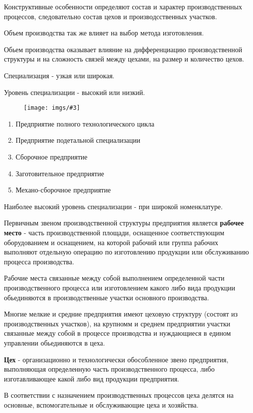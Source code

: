 \documentclass[14pt,a4paper,oneside]{extarticle}
\newcommand{\pic}[3]{
	\begin{figure}[#1]
		\begin{center}
			\texttt{[image: imgs/\#3]}
		\end{center}
	\end{figure}
}
\begin{document}
Конструктивные особенности определяют состав и характер производственных процессов, следовательно состав цехов и производсственных участков.

Объем производства так же влияет на выбор метода изготовления.

Обьем производства оказывает влияние на дифференциацию производственной структуры и на сложность связей между цехами, на размер и количество цехов.

Специализация - узкая или широкая.

Уровень специализации - высокий или низкий.

\pic{H}{\textwidth/2}{9}

\begin{enumerate}
    \item Предприятие полного технологического цикла 
    \item Предприятие подетальной специализации
    \item Сборочное предприятие
    \item Заготовительное предприятие 
    \item Механо-сборочное предприятие
\end{enumerate}

Наиболее высокий уровень специализации - при широкой номенклатуре.

Первичным звеном производственной структуры предприятия является \textbf{рабочее место} - часть производственной площади, оснащенное соответствующим оборудованием и оснащением, на которой рабочий или группа рабочих выполняют отдельную операцию по изготовлению продукции или обслуживанию процесса производства.

Рабочие места связанные между собой выполнением определенной части производственного процесса или изготовлением какого либо вида продукции обьединяются в производственные участки основного производства.

Многие мелкие и средние предприятия имеют цеховую структуру (состоят из производственных участков), на крупномм и среднем предприятии участки связанные между собой в процессе производства и нуждающиеся в едином управлении обьединяются в цеха.

\textbf{Цех} - организационно и технологически обособленное звено предприятия, выполняющая определенную часть производственного процесса, либо изготавливающее какой либо вид продукции предприятия.

В соответствии с назначением производственных процессов цеха делятся на основные, вспомогательные и обслуживающие цеха и хозяйства.
\end{document}
